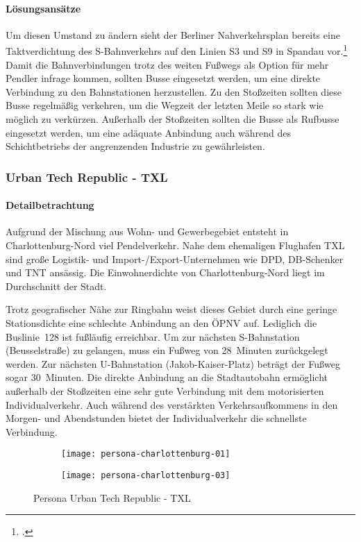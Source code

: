 \paragraph{Lösungsansätze}

Um diesen Umstand zu ändern sieht der Berliner Nahverkehrsplan bereits eine Taktverdichtung des S-Bahnverkehrs auf den Linien S3 und S9 in Spandau vor.\footcite{NahverkehrsplanBerlin} Damit die Bahnverbindungen trotz des weiten Fußwegs als Option für mehr Pendler infrage kommen, sollten Busse eingesetzt werden, um eine direkte Verbindung zu den Bahnstationen herzustellen. Zu den Stoßzeiten sollten diese Busse regelmäßig verkehren, um die Wegzeit der letzten Meile so stark wie möglich zu verkürzen. Außerhalb der Stoßzeiten sollten die Busse als Rufbusse eingesetzt werden, um eine adäquate Anbindung auch während des Schichtbetriebs der angrenzenden Industrie zu gewährleisten.

\subsubsection{Urban Tech Republic - TXL}

\paragraph{Detailbetrachtung}

Aufgrund der Mischung aus Wohn- und Gewerbegebiet entsteht in Charlottenburg-Nord viel Pendelverkehr. Nahe dem ehemaligen Flughafen TXL sind große Logistik- und Import-/Export-Unternehmen wie DPD, DB-Schenker und TNT ansässig. Die Einwohnerdichte von Charlottenburg-Nord liegt im Durchschnitt der Stadt.

Trotz geografischer Nähe zur Ringbahn weist dieses Gebiet durch eine geringe Stationsdichte eine schlechte Anbindung an den ÖPNV auf. Lediglich die Buslinie~128 ist fußläufig erreichbar. Um zur nächsten S-Bahnstation (Beusselstraße) zu gelangen, muss ein Fußweg von 28~Minuten zurückgelegt werden. Zur nächsten U-Bahnstation (Jakob-Kaiser-Platz) beträgt der Fußweg sogar 30~Minuten. Die direkte Anbindung an die Stadtautobahn ermöglicht außerhalb der Stoßzeiten eine sehr gute Verbindung mit dem motorisierten Individualverkehr. Auch während des verstärkten Verkehrsaufkommens in den Morgen- und Abendstunden bietet der Individualverkehr die schnellste Verbindung.

\begin{figure}
    \centering
    \begin{subfigure}{.5\textwidth}
        \centering
        \texttt{[image: persona-charlottenburg-01]}
    \end{subfigure}%
    \begin{subfigure}{.5\textwidth}
        \centering
        \texttt{[image: persona-charlottenburg-03]}
    \end{subfigure}
    \caption{Persona Urban Tech Republic - TXL}
    \label{persona-charlottenburg-nord}
\end{figure}

